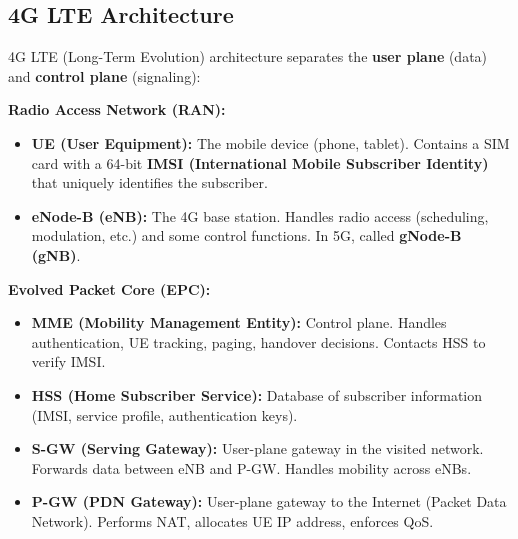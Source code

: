 \subsection{4G LTE Architecture}

\begin{keybox}
4G LTE (Long-Term Evolution) architecture separates the \textbf{user plane} (data) and \textbf{control plane} (signaling):

\medskip
\textbf{Radio Access Network (RAN):}
\begin{itemize}[noitemsep]
    \item \textbf{UE (User Equipment):} The mobile device (phone, tablet). Contains a SIM card with a 64-bit \textbf{IMSI (International Mobile Subscriber Identity)} that uniquely identifies the subscriber.
    \item \textbf{eNode-B (eNB):} The 4G base station. Handles radio access (scheduling, modulation, etc.) and some control functions. In 5G, called \textbf{gNode-B (gNB)}.
\end{itemize}

\medskip
\textbf{Evolved Packet Core (EPC):}
\begin{itemize}[noitemsep]
    \item \textbf{MME (Mobility Management Entity):} Control plane. Handles authentication, UE tracking, paging, handover decisions. Contacts HSS to verify IMSI.
    \item \textbf{HSS (Home Subscriber Service):} Database of subscriber information (IMSI, service profile, authentication keys).
    \item \textbf{S-GW (Serving Gateway):} User-plane gateway in the visited network. Forwards data between eNB and P-GW. Handles mobility across eNBs.
    \item \textbf{P-GW (PDN Gateway):} User-plane gateway to the Internet (Packet Data Network). Performs NAT, allocates UE IP address, enforces QoS.
\end{itemize}
\end{keybox}

\begin{imagebox}
\end{imagebox}

